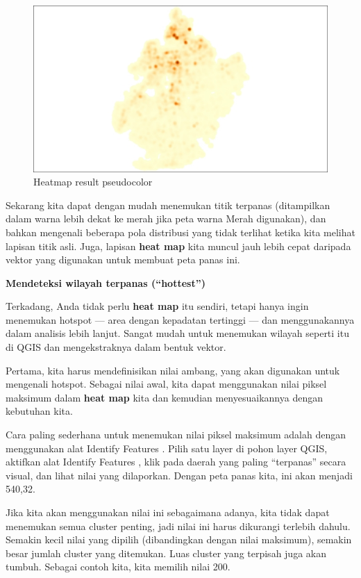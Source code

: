 \documentclass[]{book}
\begin{document}
\begin{figure}

{\centering \includegraphics[width=0.8\linewidth]{images/04/fig77} 

}

\caption{Heatmap result  pseudocolor}\label{fig:fig1477}
\end{figure}

Sekarang kita dapat dengan mudah menemukan titik terpanas (ditampilkan dalam warna lebih dekat ke merah jika peta warna Merah digunakan), dan bahkan mengenali beberapa pola distribusi yang tidak terlihat ketika kita melihat lapisan titik asli. Juga, lapisan \textbf{heat map} kita muncul jauh lebih cepat daripada vektor yang digunakan untuk membuat peta panas ini.

\textbf{Mendeteksi wilayah terpanas (``hottest'')}

Terkadang, Anda tidak perlu \textbf{heat map} itu sendiri, tetapi hanya ingin menemukan hotspot --- area dengan kepadatan tertinggi --- dan menggunakannya dalam analisis lebih lanjut. Sangat mudah untuk menemukan wilayah seperti itu di QGIS dan mengekstraknya dalam bentuk vektor.

Pertama, kita harus mendefinisikan nilai ambang, yang akan digunakan untuk mengenali hotspot. Sebagai nilai awal, kita dapat menggunakan nilai piksel maksimum dalam \textbf{heat map} kita dan kemudian menyesuaikannya dengan kebutuhan kita.

Cara paling sederhana untuk menemukan nilai piksel maksimum adalah dengan menggunakan alat Identify Features . Pilih satu layer di pohon layer QGIS, aktifkan alat Identify Features , klik pada daerah yang paling ``terpanas'' secara visual, dan lihat nilai yang dilaporkan. Dengan peta panas kita, ini akan menjadi 540,32.

Jika kita akan menggunakan nilai ini sebagaimana adanya, kita tidak dapat menemukan semua cluster penting, jadi nilai ini harus dikurangi terlebih dahulu. Semakin kecil nilai yang dipilih (dibandingkan dengan nilai maksimum), semakin besar jumlah cluster yang ditemukan. Luas cluster yang terpisah juga akan tumbuh. Sebagai contoh kita, kita memilih nilai 200.
\end{document}
